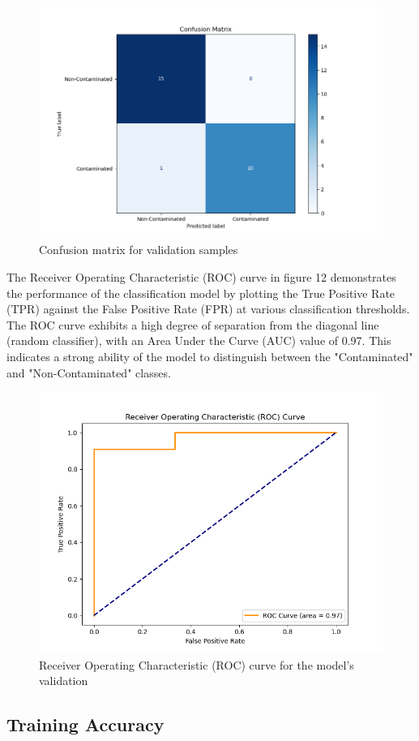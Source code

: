 \documentclass[12pt]{report}
\begin{document}
\begin{figure}[!h]
    \centering
    \includegraphics[width=0.75\linewidth]{Images/bb.png}
    \caption{Confusion matrix for validation samples}
    \label{fig:conf_matrix}
\end{figure}

The Receiver Operating Characteristic (ROC) curve in figure 12 demonstrates the performance of the classification model by plotting the True Positive Rate (TPR) against the False Positive Rate (FPR) at various classification thresholds. The ROC curve exhibits a high degree of separation from the diagonal line (random classifier), with an Area Under the Curve (AUC) value of 0.97. This indicates a strong ability of the model to distinguish between the "Contaminated" and "Non-Contaminated" classes.

\begin{figure}[!h]
    \centering
    \includegraphics[width=0.75\linewidth]{Images/cc.png}
    \caption{Receiver Operating Characteristic (ROC) curve for the model's validation}
    \label{fig:conf_matrix}
\end{figure}

\subsection{Training Accuracy}
\end{document}
